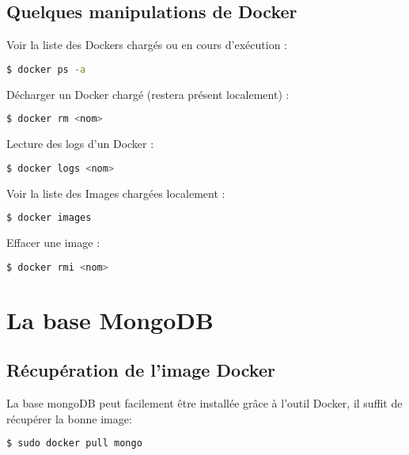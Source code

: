 \documentclass[a4paper]{article}
\begin{document}
\subsection{Quelques manipulations de Docker}

Voir la liste des Dockers chargés ou en cours d'exécution : 

\begin{lstlisting}[language=bash]
  $ docker ps -a 
\end{lstlisting}

Décharger un Docker chargé (restera présent localement) : 

\begin{lstlisting}[language=bash]
  $ docker rm <nom> 
\end{lstlisting}


Lecture des logs d'un Docker : 

\begin{lstlisting}[language=bash]
  $ docker logs <nom> 
\end{lstlisting}


Voir la liste des Images chargées localement : 

\begin{lstlisting}[language=bash]
  $ docker images
\end{lstlisting}


Effacer une image : 

\begin{lstlisting}[language=bash]
  $ docker rmi <nom> 
\end{lstlisting}




\section{La base MongoDB}
\subsection{Récupération de l'image Docker}
La base mongoDB peut facilement être installée grâce à l'outil Docker, il suffit de récupérer la bonne image:
\begin{lstlisting}[language=bash]
  $ sudo docker pull mongo
\end{lstlisting}
\end{document}

